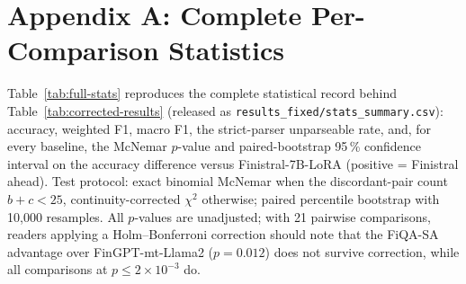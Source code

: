 \documentclass[a4paper]{article}
\begin{document}
\section*{Appendix A: Complete Per-Comparison Statistics}
\label{app:stats}

Table~\ref{tab:full-stats} reproduces the complete statistical record behind Table~\ref{tab:corrected-results} (released as \texttt{results\_fixed/stats\_summary.csv}): accuracy, weighted F1, macro F1, the strict-parser unparseable rate, and, for every baseline, the McNemar $p$-value and paired-bootstrap 95\,\% confidence interval on the accuracy difference versus Finistral-7B-LoRA (positive = Finistral ahead). Test protocol: exact binomial McNemar when the discordant-pair count $b{+}c < 25$, continuity-corrected $\chi^2$ otherwise; paired percentile bootstrap with 10{,}000 resamples. All $p$-values are unadjusted; with 21 pairwise comparisons, readers applying a Holm--Bonferroni correction should note that the FiQA-SA advantage over FinGPT-mt-Llama2 ($p=0.012$) does not survive correction, while all comparisons at $p \le 2\times10^{-3}$ do.
\end{document}
